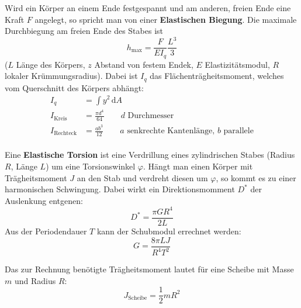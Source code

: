 Wird ein Körper an einem Ende festgespannt und am anderen, freien Ende eine Kraft $F$ angelegt, so spricht man von einer \textbf{Elastischen Biegung}.
Die maximale Durchbiegung am freien Ende des Stabes ist
\begin{equation}
  h_{\text{max}}=\frac{F}{E I_q}\frac{L^3}{3}
  \label{eq:maxbiegung}
\end{equation}
($L$ Länge des Körpers, $z$ Abstand von festem Endek, $E$ Elastizitätsmodul, $R$ lokaler Krümmungsradius). Dabei ist $I_q$ das Flächenträgheitsmoment, welches vom Querschnitt des Körpers abhängt:
\begin{align}
  I_q &= \int y^2 \, \mathrm{d}A \\
  I_{\text{Kreis}}&=\frac{\pi d^4}{64} \qquad \text{$d$ Durchmesser} \\
  I_{\text{Rechteck}}&=\frac{ab^3}{12} \qquad \text{$a$ senkrechte Kantenlänge, $b$ parallele}
  \label{eq:flaechentraegheit}
\end{align}
\\
Eine \textbf{Elastische Torsion} ist eine Verdrillung eines zylindrischen Stabes (Radius $R$, Länge $L$) um eine Torsionswinkel $\varphi$.
Hängt man einen Körper mit Trägheitsmoment $J$ an den Stab und verdreht diesen um $\varphi$, so kommt es zu einer harmonischen Schwingung.
Dabei wirkt ein Direktionsmomment $D^*$ der Auslenkung entgenen:
\begin{equation}
  D^*=\frac{\pi G R^4}{2L}
  \label{eq:direktionsmoment}
\end{equation}
Aus der Periodendauer $T$ kann der Schubmodul errechnet werden:
\begin{equation}
  G= \frac{8\pi LJ}{R^4T^2}
  \label{eq:schubmod}
\end{equation}

Das zur Rechnung benötigte Trägheitsmoment lautet für eine Scheibe mit Masse $m$ und Radius $R$:
\begin{equation}
  J_{\text{Scheibe}}=\frac{1}{2}mR^2
  \label{eq:j_scheibe}
\end{equation}


